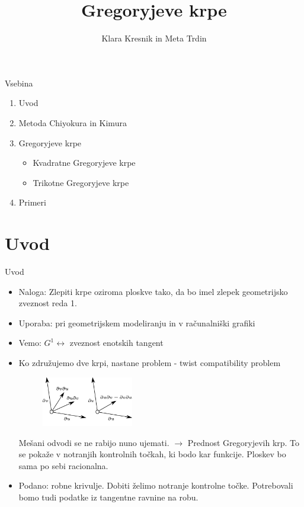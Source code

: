 \documentclass[a4paper,8pt]{beamer}
\title{Gregoryjeve krpe}
\author{Klara Kresnik in Meta Trdin} %
\institute[FMF]{Fakulteta za matematiko in fiziko}
\date{}
\begin{document}
\begin{frame}
\maketitle
\end{frame}

\begin{frame}{Vsebina}

\fontsize{14pt}{7.2}\selectfont

\begin{enumerate}
	\item Uvod
	\item Metoda Chiyokura in Kimura
	\item Gregoryjeve krpe
	\begin{itemize}
		\fontsize{10pt}{7.2}\selectfont
		\item Kvadratne Gregoryjeve krpe
		\item Trikotne Gregoryjeve krpe
	\end{itemize}
    \item Primeri
\end{enumerate}

\end{frame}

\section{Uvod}
\begin{frame}{Uvod}
\begin{itemize}
	\item Naloga: Zlepiti krpe oziroma ploskve tako, da bo imel zlepek geometrijsko zveznost reda 1. 
	\item Uporaba: pri geometrijskem modeliranju in v računalniški 	grafiki
	
	\item Vemo: $G^1 \leftrightarrow$ zveznost enotskih tangent
	\item Ko združujemo dve krpi, nastane problem - twist compatibility problem
	\pause
	\begin{figure}[h]
		\centering
		\includegraphics[width=4cm]{mesani_odvodi_ob.jpg}
	\end{figure}
	Mešani odvodi se ne rabijo nuno ujemati. $\rightarrow$ Prednost Gregoryjevih krp. To se pokaže v notranjih kontrolnih točkah, ki bodo kar funkcije. Ploskev bo sama po sebi racionalna.
	\item Podano: robne krivulje. Dobiti želimo notranje kontrolne točke. Potrebovali bomo tudi podatke iz tangentne ravnine na robu.

	
\end{itemize}

\end{frame}
\end{document}
